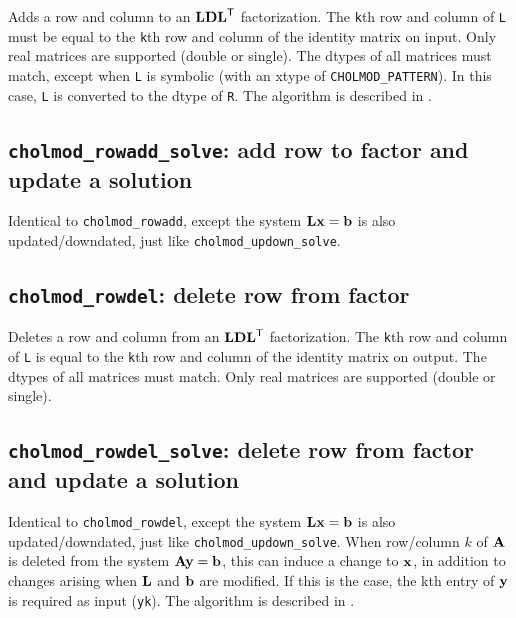 \documentclass[11pt]{article}
\newcommand{\m}[1]{{\bf{#1}}}       %
\newcommand{\tr}{^{\sf T}}          %
\begin{document}

Adds a row and column to an $\m{LDL}\tr$ factorization.  The {\tt k}th row and
column of {\tt L} must be equal to the {\tt k}th row and column of the identity
matrix on input.  Only real matrices are supported (double or single).  The
dtypes of all matrices must match, except when \verb'L' is symbolic (with an
xtype of \verb'CHOLMOD_PATTERN').  In this case, \verb'L' is converted to the
dtype of \verb'R'.  The algorithm is described in \cite{DavisHager05}.  

\subsection{{\tt cholmod\_rowadd\_solve}: add row to factor and update a
solution}


Identical to {\tt cholmod\_rowadd}, except the system $\m{Lx}=\m{b}$ is also
updated/downdated, just like {\tt cholmod\_updown\_solve}.

\subsection{{\tt cholmod\_rowdel}: delete row from factor}


Deletes a row and column from an $\m{LDL}\tr$ factorization.  The {\tt k}th row
and column of {\tt L} is equal to the {\tt k}th row and column of the identity
matrix on output.  The dtypes of all matrices must match.  Only real matrices
are supported (double or single).

\subsection{{\tt cholmod\_rowdel\_solve}: delete row from factor and update a solution}


Identical to {\tt cholmod\_rowdel}, except the system $\m{Lx}=\m{b}$ is also
updated/downdated, just like {\tt cholmod\_updown\_solve}.  When row/column $k$
of $\m{A}$ is deleted from the system $\m{Ay}=\m{b}$, this can induce a change
to $\m{x}$, in addition to changes arising when $\m{L}$ and $\m{b}$ are
modified.  If this is the case, the kth entry of $\m{y}$ is required as input
({\tt yk}).  The algorithm is described in \cite{DavisHager05}.
\end{document}
